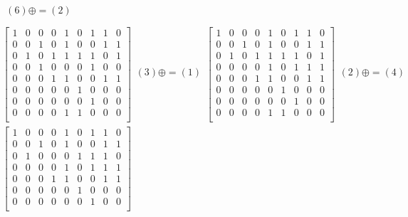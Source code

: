 \documentclass[a4paper,10pt]{article} %
\begin{document}
\begin{multline}
\begin{align}
		(6) \oplus= (2)\\
		\end{align}\\
		\begin{bmatrix}
		1 & 0 & 0 & 0 & 1 & 0 & 1 & 1 & 0 \\
		0 & 0 & 1 & 0 & 1 & 0 & 0 & 1 & 1 \\
		0 & 1 & 0 & 1 & 1 & 1 & 1 & 0 & 1 \\
		0 & 0 & 1 & 0 & 0 & 0 & 1 & 0 & 0 \\
		0 & 0 & 0 & 1 & 1 & 0 & 0 & 1 & 1 \\
		0 & 0 & 0 & 0 & 0 & 1 & 0 & 0 & 0 \\
		0 & 0 & 0 & 0 & 0 & 0 & 1 & 0 & 0 \\
		0 & 0 & 0 & 0 & 1 & 1 & 0 & 0 & 0 \\
		\end{bmatrix}
		\begin{align}
		(3) \oplus= (1)\\
		\end{align}
		\begin{bmatrix}
		1 & 0 & 0 & 0 & 1 & 0 & 1 & 1 & 0 \\
		0 & 0 & 1 & 0 & 1 & 0 & 0 & 1 & 1 \\
		0 & 1 & 0 & 1 & 1 & 1 & 1 & 0 & 1 \\
		0 & 0 & 0 & 0 & 1 & 0 & 1 & 1 & 1 \\
		0 & 0 & 0 & 1 & 1 & 0 & 0 & 1 & 1 \\
		0 & 0 & 0 & 0 & 0 & 1 & 0 & 0 & 0 \\
		0 & 0 & 0 & 0 & 0 & 0 & 1 & 0 & 0 \\
		0 & 0 & 0 & 0 & 1 & 1 & 0 & 0 & 0 \\
		\end{bmatrix}
		\begin{align}
		(2) \oplus= (4)\\
		\end{align}\\
		\begin{bmatrix}
		1 & 0 & 0 & 0 & 1 & 0 & 1 & 1 & 0 \\
		0 & 0 & 1 & 0 & 1 & 0 & 0 & 1 & 1 \\
		0 & 1 & 0 & 0 & 0 & 1 & 1 & 1 & 0 \\
		0 & 0 & 0 & 0 & 1 & 0 & 1 & 1 & 1 \\
		0 & 0 & 0 & 1 & 1 & 0 & 0 & 1 & 1 \\
		0 & 0 & 0 & 0 & 0 & 1 & 0 & 0 & 0 \\
		0 & 0 & 0 & 0 & 0 & 0 & 1 & 0 & 0 \\

\end{bmatrix}
\end{multline}
\end{document}
